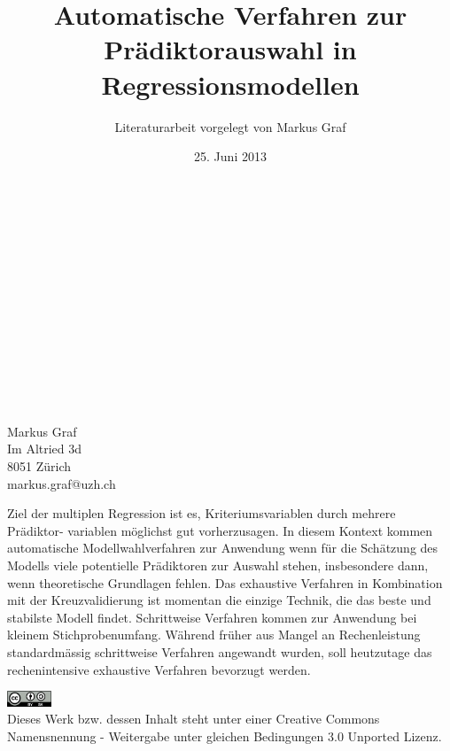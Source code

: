 \documentclass[german,12pt,doc]{apa}
\begin{document}
\begin{titlepage}

\title{Automatische Verfahren zur Prädiktorauswahl in Regressionsmodellen}
\author{Literaturarbeit vorgelegt von Markus Graf}
\date{25. Juni 2013}

\maketitle
\\
\\
\\
\\
\\
\\
\\
\\
\\
\\
\\
\\
Markus Graf\\
Im Altried 3d\\
8051 Zürich\\
markus.graf@uzh.ch
\end{titlepage}
\thispagestyle{empty}
Ziel der multiplen Regression ist es, Kriteriumsvariablen durch mehrere Prädiktor- variablen möglichst gut vorherzusagen. In diesem Kontext kommen automatische Modellwahlverfahren zur Anwendung wenn für die Schätzung des Modells viele potentielle Prädiktoren zur Auswahl stehen, insbesondere dann, wenn theoretische Grundlagen fehlen. Das exhaustive Verfahren in Kombination mit der Kreuzvalidierung ist momentan die einzige Technik, die das beste und stabilste Modell findet. Schrittweise Verfahren kommen zur Anwendung bei kleinem Stichprobenumfang. Während früher aus Mangel an Rechenleistung standardmässig schrittweise Verfahren angewandt wurden, soll heutzutage das rechenintensive exhaustive Verfahren bevorzugt werden.

\begin{center}
\includegraphics[width=0.1\textwidth]{cc_by_sa.jpg}\\
Dieses Werk bzw. dessen Inhalt steht unter einer Creative Commons Namensnennung - Weitergabe unter gleichen Bedingungen 3.0 Unported Lizenz.
\end{center}
\setlength{\parindent}{0pt}
\newpage
\thispagestyle{empty}
\begin{spacing}{0.01}
\tableofcontents
\end{spacing}
\newpage
\end{document}
